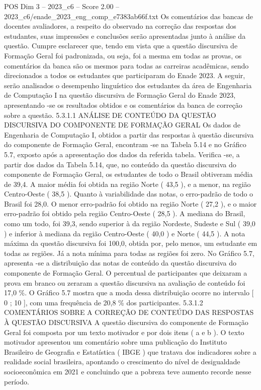 \begin{textsample}{POS Dim 3 – 2023\_c6 – Score 2.00 – 2023\_c6/enade\_2023\_eng\_comp\_e7383ab66f.txt}
Os comentários das bancas de docentes avaliadores, a respeito do observado na correção das respostas dos estudantes, suas impressões e conclusões serão apresentadas junto à análise da questão.
Cumpre esclarecer que, tendo em vista que a questão discursiva de Formação Geral foi padronizada, ou seja, foi a mesma em todas as provas, os comentários da banca são os mesmos para todas as carreiras acadêmicas, sendo direcionados a todos os estudantes que participaram do Enade 2023.
A seguir, serão analisados o desempenho linguístico dos estudantes da área de Engenharia de Computação I na questão discursiva de Formação Geral do Enade 2023, apresentando -se os resultados obtidos e os comentários da banca de correção sobre a questão. 5.3.1.1 ANÁLISE DE CONTEÚDO DA QUESTÃO DISCURSIVA DO COMPONENTE DE FORMAÇÃO GERAL Os dados de Engenharia de Computação I, obtidos a partir das respostas à questão discursiva do componente de Formação Geral, encontram -se na Tabela 5.14 e no Gráfico 5.7, exposto após a apresentação dos dados da referida tabela.
Verifica -se, a partir dos dados da Tabela 5.14, que, no conteúdo da questão discursiva do componente de Formação Geral, os estudantes de todo o Brasil obtiveram média de 39,4.
A maior média foi obtida na região Norte ( 43,5 ), e a menor, na região Centro-Oeste ( 38,5 ).
Quanto à variabilidade das notas, o erro-padrão de todo o Brasil foi 28,0.
O menor erro-padrão foi obtido na região Norte ( 27,2 ), e o maior erro-padrão foi obtido pela região Centro-Oeste ( 28,5 ).
A mediana do Brasil, como um todo, foi 39,3, sendo superior à da região Nordeste, Sudeste e Sul ( 39,0 ) e inferior à mediana da região Centro-Oeste ( 40,0 ) e Norte ( 44,5 ).
A nota máxima da questão discursiva foi 100,0, obtida por, pelo menos, um estudante em todas as regiões.
Já a nota mínima para todas as regiões foi zero.
No Gráfico 5.7, apresenta -se a distribuição das notas de conteúdo da questão discursiva do componente de Formação Geral.
O percentual de participantes que deixaram a prova em branco ou zeraram a questão discursiva na avaliação de conteúdo foi 17,0 \%.
O Gráfico 5.7 mostra que a moda dessa distribuição ocorre no intervalo [ 0 ; 10 ], com uma frequência de 20,8 \% dos participantes. 5.3.1.2 COMENTÁRIOS SOBRE A CORREÇÃO DE CONTEÚDO DAS RESPOSTAS À QUESTÃO DISCURSIVA A questão discursiva do componente de Formação Geral foi composta por um texto motivador e por dois itens ( a e b ).
O texto motivador apresentou um comentário sobre uma publicação do Instituto Brasileiro de Geografia e Estatística ( IBGE ) que tratava dos indicadores sobre a realidade social brasileira, apontando o crescimento do nível de desigualdade socioeconômica em 2021 e concluindo que a pobreza teve aumento recorde nesse período.

\end{textsample}
